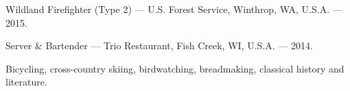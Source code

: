 Wildland Firefighter (Type 2) --- U.S. Forest Service, Winthrop, WA, U.S.A. --- 2015.

Server \& Bartender --- Trio Restaurant, Fish Creek, WI, U.S.A. --- 2014.

 	Bicycling, cross-country skiing, birdwatching, breadmaking, classical history and literature.